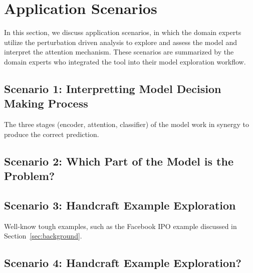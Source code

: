 \section{Application Scenarios}
\label{sec:caseStudy}
In this section, we discuss application scenarios, in which the domain experts utilize the perturbation driven analysis to explore and assess the model and interpret the attention mechanism.
%
These scenarios are summarized by the domain experts who integrated the tool into their model exploration workflow.

\subsection{Scenario 1: Interpretting Model Decision Making Process}
The three stages (encoder, attention, classifier) of the model work in synergy to produce the correct prediction.


\subsection{Scenario 2: Which Part of the Model is the Problem?}

\subsection{Scenario 3: Handcraft Example Exploration}
Well-know tough examples, such as the Facebook IPO example discussed in Section~\ref{sec:background}.

\subsection{Scenario 4: Handcraft Example Exploration?}

